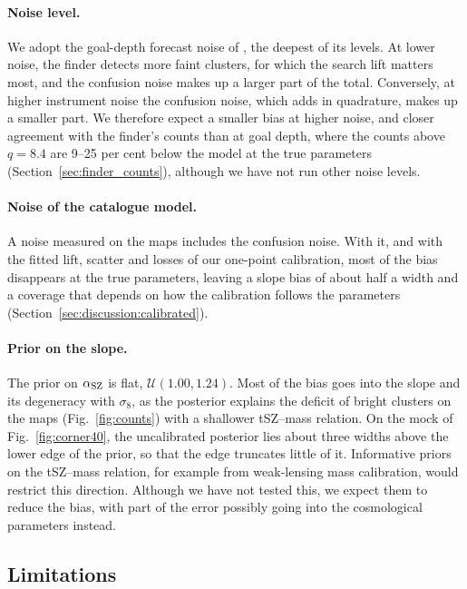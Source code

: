 \paragraph*{Noise level.} We adopt the goal-depth forecast noise of \citet{SO2019}, the deepest of its
levels. At lower noise, the finder detects more faint clusters, for which the search lift matters most,
and the confusion noise makes up a larger part of the total. Conversely, at higher instrument noise the
confusion noise, which adds in quadrature, makes up a smaller part. We therefore expect a smaller bias at
higher noise, and closer agreement with the finder's counts than at goal depth, where the counts above
$q=8.4$ are 9--25 per cent below the model at the true parameters (Section~\ref{sec:finder_counts}),
although we have not run other noise levels.

\paragraph*{Noise of the catalogue model.} A noise measured on the maps includes the confusion noise.
With it, and with the fitted lift, scatter and losses of our one-point calibration, most of the bias
disappears at the true parameters, leaving a slope bias of about half a width and a coverage that depends
on how the calibration follows the parameters (Section~\ref{sec:discussion:calibrated}).

\paragraph*{Prior on the slope.} The prior on $\alpha_\mathrm{SZ}$ is flat, $\mathcal U(1.00,1.24)$. Most of the bias goes into the slope and its degeneracy with $\sigma_8$, as the posterior explains the deficit of
bright clusters on the maps (Fig.~\ref{fig:counts}) with a shallower tSZ--mass relation. On the mock of
Fig.~\ref{fig:corner40}, the uncalibrated posterior lies about three widths above the lower edge of the
prior, so that the edge truncates little of it. Informative priors on the tSZ--mass relation, for example
from weak-lensing mass calibration, would restrict this direction. Although we have not tested this, we
expect them to reduce the bias, with part of the error possibly going into the cosmological parameters
instead.

\subsection{Limitations}\label{sec:discussion:limits}


